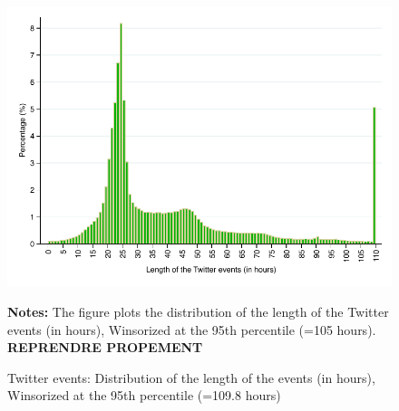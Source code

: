 \clearpage
\pagebreak
\begin{figure}
\begin{center}
\includegraphics[scale=1]{figures/distribution_length_Tevents}
\end{center}
	\begin{spacing}{0.5}
		{\footnotesize \textbf{Notes:} The figure plots the distribution of the length of the Twitter events (in hours), Winsorized at the 95th percentile (=105 hours). \textbf{REPRENDRE PROPEMENT}}
	\end{spacing}
\vspace{.5cm}	
	\caption{ Twitter events: Distribution of the length of the events (in hours),
Winsorized at the 95th percentile (=109.8 hours)}
	\label{fig:distribution_length_Tevents}
\end{figure}



% 
% 

% 
